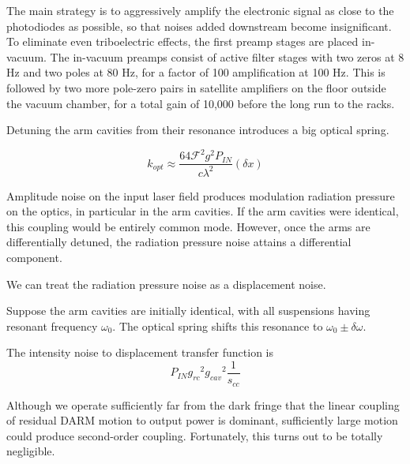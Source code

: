 The main strategy is to aggressively amplify the electronic signal as close to
the photodiodes as possible, so that noises added downstream become
insignificant.  To eliminate even triboelectric effects, the first preamp stages
are placed in-vacuum.  The in-vacuum preamps consist of active filter stages
with two zeros at 8 Hz and two poles at 80 Hz, for a factor of 100 amplification
at 100 Hz.  This is followed by two more pole-zero pairs in satellite amplifiers
on the floor outside the vacuum chamber, for a total gain of 10,000 before the
long run to the racks.

%
Detuning the arm cavities from their resonance introduces a big optical
spring.

\begin{equation}
k_{opt}\approx\frac{64\mathcal{F}^{2}g^{2}P_{IN}}{c\lambda^{2}}\left(\delta x\right) 
\end{equation}


Amplitude noise on the input laser field produces modulation radiation
pressure on the optics, in particular in the arm cavities.  If the arm
cavities were identical, this coupling would be entirely common mode.
However, once the arms are differentially detuned, the radiation
pressure noise attains a differential component.

We can treat the radiation pressure noise as a displacement noise.

Suppose the arm cavities are initially identical, with all 
suspensions having resonant frequency $\omega_0$.  The optical spring
shifts this resonance to $\omega_0 \pm \delta\omega$.

The intensity noise to displacement transfer function is
\begin{equation}
  P_{IN} {g_{rc}}^2 {g_{cav}}^2 \frac{1}{s_{cc}} 
\end{equation}

%
Although we operate sufficiently far from the dark fringe that the
linear coupling of residual DARM motion to output power is dominant,
sufficiently large motion could produce second-order coupling. Fortunately,
this turns out to be totally negligible.

